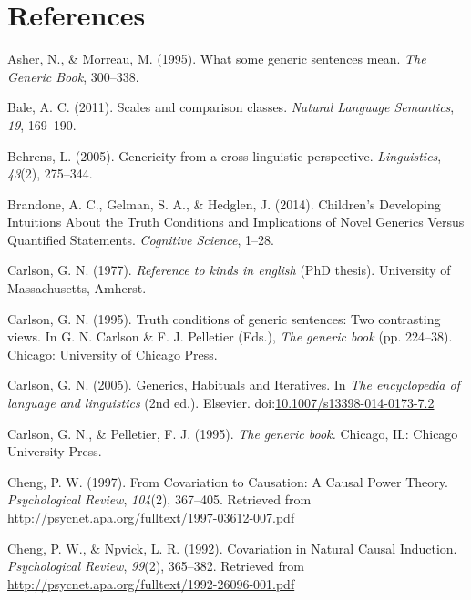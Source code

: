 \documentclass[english,,man,floatsintext]{apa6}
\theoremstyle{definition}
\theoremstyle{definition}
\theoremstyle{definition}
\theoremstyle{remark}
\begin{document}
\newpage

\hypertarget{references}{%
\section{References}\label{references}}

\hypertarget{refs}{}
\leavevmode\hypertarget{ref-Asher1995}{}%
Asher, N., \& Morreau, M. (1995). What some generic sentences mean.
\emph{The Generic Book}, 300--338.

\leavevmode\hypertarget{ref-Bale2011}{}%
Bale, A. C. (2011). Scales and comparison classes. \emph{Natural
Language Semantics}, \emph{19}, 169--190.

\leavevmode\hypertarget{ref-Behrens2005}{}%
Behrens, L. (2005). Genericity from a cross-linguistic perspective.
\emph{Linguistics}, \emph{43}(2), 275--344.

\leavevmode\hypertarget{ref-Brandone2014}{}%
Brandone, A. C., Gelman, S. A., \& Hedglen, J. (2014). Children's
Developing Intuitions About the Truth Conditions and Implications of
Novel Generics Versus Quantified Statements. \emph{Cognitive Science},
1--28.

\leavevmode\hypertarget{ref-Carlson1977}{}%
Carlson, G. N. (1977). \emph{Reference to kinds in english}
(PhD thesis). University of Massachusetts, Amherst.

\leavevmode\hypertarget{ref-Carlson1995essay}{}%
Carlson, G. N. (1995). Truth conditions of generic sentences: Two
contrasting views. In G. N. Carlson \& F. J. Pelletier (Eds.), \emph{The
generic book} (pp. 224--38). Chicago: University of Chicago Press.

\leavevmode\hypertarget{ref-Carlson2005}{}%
Carlson, G. N. (2005). Generics, Habituals and Iteratives. In \emph{The
encyclopedia of language and linguistics} (2nd ed.). Elsevier.
doi:\href{https://doi.org/10.1007/s13398-014-0173-7.2}{10.1007/s13398-014-0173-7.2}

\leavevmode\hypertarget{ref-Carlson1995}{}%
Carlson, G. N., \& Pelletier, F. J. (1995). \emph{The generic book.}
Chicago, IL: Chicago University Press.

\leavevmode\hypertarget{ref-Cheng1997}{}%
Cheng, P. W. (1997). From Covariation to Causation: A Causal Power
Theory. \emph{Psychological Review}, \emph{104}(2), 367--405. Retrieved
from \url{http://psycnet.apa.org/fulltext/1997-03612-007.pdf}

\leavevmode\hypertarget{ref-Cheng1992}{}%
Cheng, P. W., \& Npvick, L. R. (1992). Covariation in Natural Causal
Induction. \emph{Psychological Review}, \emph{99}(2), 365--382.
Retrieved from \url{http://psycnet.apa.org/fulltext/1992-26096-001.pdf}
\end{document}

